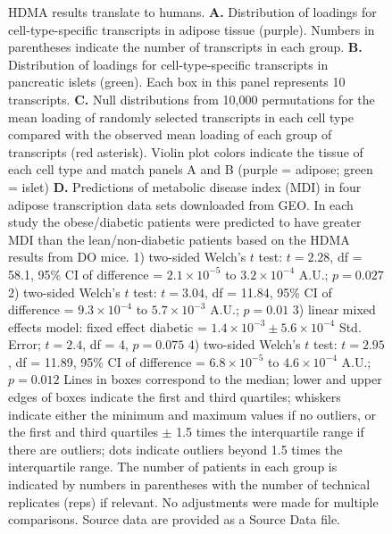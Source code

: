 \documentclass[
]{article}
\begin{document}
\begin{figure}[ht!]
\caption{HDMA results translate to humans. \textbf{A.} Distribution of 
loadings for cell-type-specific transcripts in adipose tissue
(purple). Numbers in parentheses indicate the number of 
transcripts in each group. \textbf{B.} Distribution of loadings 
for cell-type-specific transcripts in pancreatic islets (green). 
Each box in this panel represents 10 transcripts. \textbf{C.} 
Null distributions from 10,000 permutations for the mean 
loading of randomly selected transcripts in each cell type 
compared with the observed mean loading of each group 
of transcripts (red asterisk). Violin plot colors indicate the 
tissue of each cell type and match panels A and B 
(purple = adipose; green = islet) \textbf{D.} Predictions of 
metabolic disease index (MDI) in four adipose transcription 
data sets downloaded from GEO. In each study the 
obese/diabetic patients were predicted to have greater 
MDI than the lean/non-diabetic patients based on the 
HDMA results from DO mice. 1) two-sided Welch's $t$ test: $t = 2.28$, 
df = 58.1, 95\% CI of difference = $2.1\times10^{-5}$ 
to $3.2\times10^{-4}$ A.U.; $p = 0.027$
2) two-sided Welch's $t$ test: $t = 3.04$, 
df = 11.84, 95\% CI of difference = $9.3\times10^{-4}$ 
to $5.7\times10^{-3}$ A.U.; $p = 0.01$
3) linear mixed effects model: 
fixed effect diabetic = 
$1.4\times10^{-3}\pm5.6\times10^{-4}$ Std. Error;
$t = 2.4$, df = 4, $p = 0.075$
4) two-sided Welch's $t$ test: $t = 2.95$, 
df = 11.89, 95\% CI of difference = $6.8\times10^{-5}$ 
to $4.6\times10^{-4}$ A.U.; $p = 0.012$
Lines in boxes correspond to the 
median; lower and upper edges of boxes indicate the 
first and third quartiles; whiskers indicate either the minimum
and maximum values if no outliers, or the first and third quartiles 
$\pm$ 1.5 times the interquartile range if there are outliers; 
dots indicate outliers beyond 1.5 times the interquartile range. 
The number of patients in each group is indicated by numbers 
in parentheses with the number of technical replicates (reps) if 
relevant. No adjustments were made for multiple comparisons. 
Source data are provided as a Source Data file.
}
\label{fig:human_translation}
\end{figure}
\end{document}
